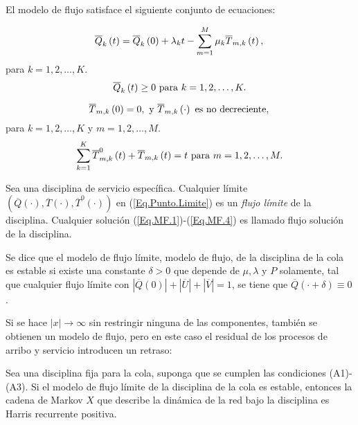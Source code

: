 El modelo de flujo satisface el siguiente conjunto de ecuaciones:

\begin{equation}\label{Eq.MF.1}
\overline{Q}_{k}\left(t\right)=\overline{Q}_{k}\left(0\right)+\lambda_{k}t-\sum_{m=1}^{M}\mu_{k}\overline{T}_{m,k}\left(t\right),\\
\end{equation}
para $k=1,2,\ldots,K$.\\
\begin{equation}\label{Eq.MF.2}
\overline{Q}_{k}\left(t\right)\geq0\textrm{ para
}k=1,2,\ldots,K.\\
\end{equation}

\begin{equation}\label{Eq.MF.3}
\overline{T}_{m,k}\left(0\right)=0,\textrm{ y }\overline{T}_{m,k}\left(\cdot\right)\textrm{ es no decreciente},\\
\end{equation}
para $k=1,2,\ldots,K$ y $m=1,2,\ldots,M$.\\
\begin{equation}\label{Eq.MF.4}
\sum_{k=1}^{K}\overline{T}_{m,k}^{0}\left(t\right)+\overline{T}_{m,k}\left(t\right)=t\textrm{
para }m=1,2,\ldots,M.\\
\end{equation}


\begin{Def}\label{Def.Modelo.Flujo}
Sea una disciplina de servicio espec\'ifica. Cualquier l\'imite
$\left(\overline{Q}\left(\cdot\right),\overline{T}\left(\cdot\right),\overline{T}^{0}\left(\cdot\right)\right)$
en (\ref{Eq.Punto.Limite}) es un {\em flujo l\'imite} de la
disciplina. Cualquier soluci\'on (\ref{Eq.MF.1})-(\ref{Eq.MF.4})
es llamado flujo soluci\'on de la disciplina.
\end{Def}

\begin{Def}
Se dice que el modelo de flujo l\'imite, modelo de flujo, de la
disciplina de la cola es estable si existe una constante
$\delta>0$ que depende de $\mu,\lambda$ y $P$ solamente, tal que
cualquier flujo l\'imite con
$|\overline{Q}\left(0\right)|+|\overline{U}|+|\overline{V}|=1$, se
tiene que $\overline{Q}\left(\cdot+\delta\right)\equiv0$.
\end{Def}

Si se hace $|x|\rightarrow\infty$ sin restringir ninguna de las
componentes, tambi\'en se obtienen un modelo de flujo, pero en
este caso el residual de los procesos de arribo y servicio
introducen un retraso:
\begin{Teo}\label{Tma.4.2.Dai}
Sea una disciplina fija para la cola, suponga que se cumplen las
condiciones (A1)-(A3). Si el modelo de flujo l\'imite de la
disciplina de la cola es estable, entonces la cadena de Markov $X$
que describe la din\'amica de la red bajo la disciplina es Harris
recurrente positiva.
\end{Teo}

